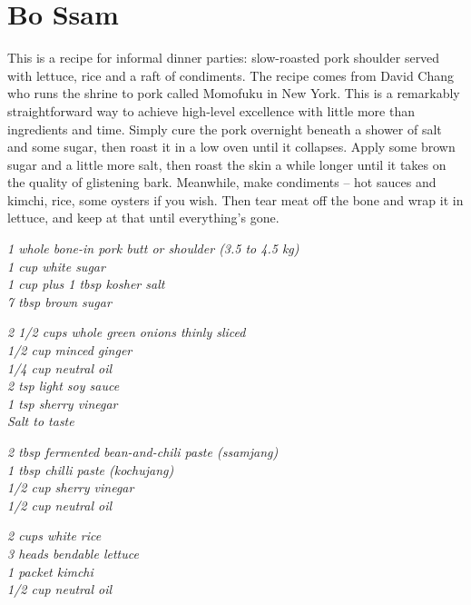 \documentclass{tufte-book}
\begin{document}
\section{Bo Ssam}

This is a recipe for informal dinner parties: slow-roasted pork shoulder served with lettuce, rice and a raft of condiments. The recipe comes from  David Chang who runs the shrine to pork called  Momofuku in New York. This is a remarkably straightforward way to achieve high-level excellence with little more than ingredients and time. Simply cure the pork overnight beneath a shower of salt and some sugar, then roast it in a low oven until it collapses. Apply some brown sugar and a little more salt, then roast the skin a while longer until it takes on the quality of glistening bark. Meanwhile, make condiments – hot sauces and kimchi, rice, some oysters if you wish. Then tear meat off the bone and wrap it in lettuce, and keep at that until everything's gone.


\emph{1 whole bone-in pork butt or shoulder (3.5 to 4.5 kg)
\\1 cup white sugar
\\1 cup plus 1 tbsp kosher salt
\\7 tbsp brown sugar
}


\emph{2 1/2 cups whole green onions thinly sliced
\\1/2 cup minced ginger
\\1/4 cup neutral oil
\\2 tsp light soy sauce
\\1 tsp sherry vinegar
\\Salt to taste
}


\emph{2 tbsp fermented bean-and-chili paste (ssamjang)
\\1 tbsp chilli paste (kochujang)
\\1/2 cup sherry vinegar
\\1/2 cup neutral oil
}


\emph{2 cups white rice
\\3 heads bendable lettuce
\\1 packet kimchi
\\1/2 cup neutral oil
}
\end{document}
